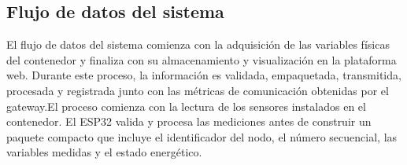 \subsection{Flujo de datos del sistema}

El flujo de datos del sistema comienza con la adquisición de las variables físicas del contenedor y finaliza con su almacenamiento y visualización en la plataforma web. Durante este proceso, la información es validada, empaquetada, transmitida, procesada y registrada junto con las métricas de comunicación obtenidas por el gateway.El proceso comienza con la lectura de los sensores instalados en el contenedor. El ESP32 valida y procesa las mediciones antes de construir un paquete compacto que incluye el identificador del nodo, el número secuencial, las variables medidas y el estado energético.

